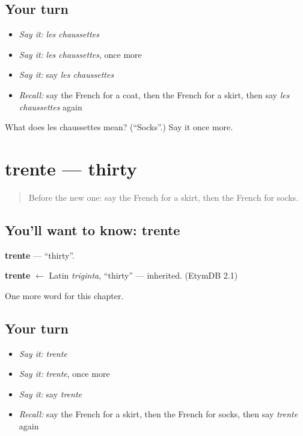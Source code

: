 \subsection*{Your turn}
\begin{itemize}
\raggedright
  \item \emph{Say it:} \emph{les chaussettes}
  \item \emph{Say it:} \emph{les chaussettes}, once more
  \item \emph{Say it:} say \emph{les chaussettes}
  \item \emph{Recall:} say the French for a coat, then the French for a skirt, then say \emph{les chaussettes} again
\end{itemize}

\begin{tcolorbox}[breakable,colback=teal!4,colframe=teal!35!black,title={Before you move on}]
What does les chaussettes mean? (\textquotedblleft{}Socks\textquotedblright{}.) Say it once more.
\end{tcolorbox}
\section[trente]{trente — thirty}

\label{lesson:FR-C105-trente}



\begin{quote}
Before the new one: say the French for a skirt, then the French for socks.
\end{quote}

\subsection*{You'll want to know: trente}
\textbf{trente} — \textquotedblleft{}thirty\textquotedblright{}.

\begin{cousinweb}
\textbf{trente} $\leftarrow$ Latin \emph{triginta}, \textquotedblleft{}thirty\textquotedblright{} — inherited. (EtymDB 2.1)
\end{cousinweb}

\begin{grammarlens}[title={What you've built}]
One more word for this chapter.
\end{grammarlens}

\subsection*{Your turn}
\begin{itemize}
\raggedright
  \item \emph{Say it:} \emph{trente}
  \item \emph{Say it:} \emph{trente}, once more
  \item \emph{Say it:} say \emph{trente}
  \item \emph{Recall:} say the French for a skirt, then the French for socks, then say \emph{trente} again
\end{itemize}

